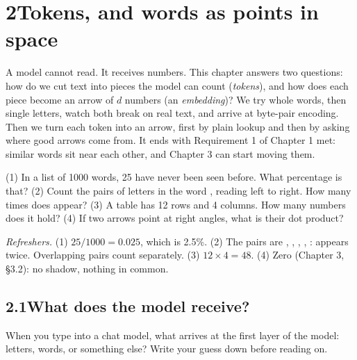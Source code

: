 \newpage
\section*{2\quad Tokens, and words as points in space}

\begin{chaptermap}
A model cannot read. It receives numbers. This chapter answers two questions: how do we cut text into
pieces the model can count (\emph{tokens}), and how does each piece become an arrow of $d$ numbers
(an \emph{embedding})? We try whole words, then single letters, watch both break on real text, and arrive
at byte-pair encoding. Then we turn each token into an arrow, first by plain lookup and then by asking
where good arrows come from. It ends with Requirement 1 of Chapter 1 met: similar words sit near each
other, and Chapter 3 can start moving them.
\end{chaptermap}


\begin{beforeyoustart}
(1) In a list of 1000 words, 25 have never been seen before. What percentage is that?
(2) Count the pairs of letters in the word , reading left to right. How many times does
 appear? (3) A table has 12 rows and 4 columns. How many numbers does it hold?
(4) If two arrows point at right angles, what is their dot product?

\smallskip\noindent\textit{Refreshers.} (1) $25/1000 = 0.025$, which is 2.5\%. (2) The pairs are ,
, , , :  appears twice. Overlapping pairs count separately.
(3) $12\times4=48$. (4) Zero (Chapter 3, \S3.2): no shadow, nothing in common.
\end{beforeyoustart}

\subsection*{2.1\quad What does the model receive?}

\Predict When you type  into a chat model, what arrives at the first layer of the
model: letters, words, or something else? Write your guess down before reading on.

